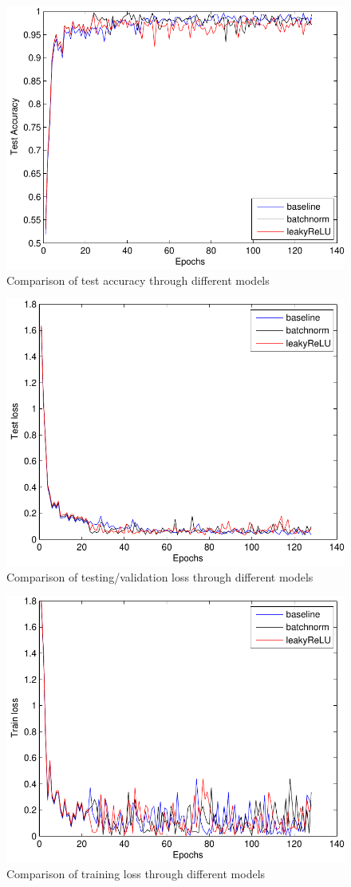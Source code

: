 \documentclass[a4paper]{article}
\begin{document}
\begin{figure}[H]
	\centering
	\includegraphics[width=0.7\linewidth]{figures/comparison_accuracy.pdf}
	\caption{Comparison of test accuracy through different models \label{fig:4}}
\end{figure}

\begin{figure}[H]
	\centering
	\includegraphics[width=0.7\linewidth]{figures/comparison_testloss.pdf}
	\caption{Comparison of testing/validation loss through different models \label{fig:5}}
\end{figure}

\begin{figure}[H]
	\centering
	\includegraphics[width=0.7\linewidth]{figures/comparison_trainloss.pdf}
	\caption{Comparison of training loss through different models \label{fig:6}}
\end{figure}





\end{document}
